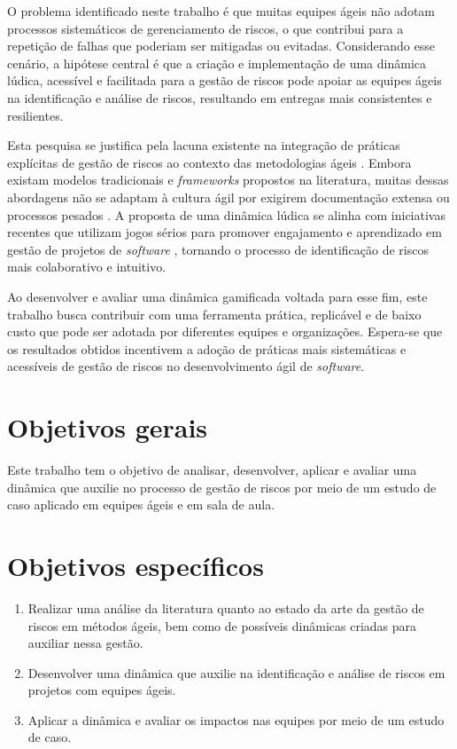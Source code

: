 \documentclass[
	12pt,
	openright,
	twoside,
	a4paper,
	english,
	brazil
	]{abntex2}
\begin{document}
O problema identificado neste trabalho é que muitas equipes ágeis não adotam processos sistemáticos de gerenciamento de riscos, o que contribui para a repetição de falhas que poderiam ser mitigadas ou evitadas. Considerando esse cenário, a hipótese central é que a criação e implementação de uma dinâmica lúdica, acessível e facilitada para a gestão de riscos pode apoiar as equipes ágeis na identificação e análise de riscos, resultando em entregas mais consistentes e resilientes.

Esta pesquisa se justifica pela lacuna existente na integração de práticas explícitas de gestão de riscos ao contexto das metodologias ágeis \cite{LopesSamueldeSouza2022ARMF}. Embora existam modelos tradicionais e \textit{frameworks} propostos na literatura, muitas dessas abordagens não se adaptam à cultura ágil por exigirem documentação extensa ou processos pesados \cite{Gold}. A proposta de uma dinâmica lúdica se alinha com iniciativas recentes que utilizam jogos sérios para promover engajamento e aprendizado em gestão de projetos de \textit{software} \cite{SERGE, Caponetto, Alomari}, tornando o processo de identificação de riscos mais colaborativo e intuitivo.

Ao desenvolver e avaliar uma dinâmica gamificada voltada para esse fim, este trabalho busca contribuir com uma ferramenta prática, replicável e de baixo custo que pode ser adotada por diferentes equipes e organizações. Espera-se que os resultados obtidos incentivem a adoção de práticas mais sistemáticas e acessíveis de gestão de riscos no desenvolvimento ágil de \textit{software}.

\section{Objetivos gerais}

Este trabalho tem o objetivo de analisar, desenvolver, aplicar e avaliar uma dinâmica que auxilie no processo de gestão de riscos por meio de um estudo de caso aplicado em equipes ágeis e em sala de aula.

\section{Objetivos específicos}

\begin{enumerate}
  \item Realizar uma análise da literatura quanto ao estado da arte da gestão de riscos em métodos ágeis, bem como de possíveis dinâmicas criadas para auxiliar nessa gestão.
  \item Desenvolver uma dinâmica que auxilie na identificação e análise de riscos em projetos com equipes ágeis.
  \item Aplicar a dinâmica e avaliar os impactos nas equipes por meio de um estudo de caso.
\end{enumerate}
\end{document}
